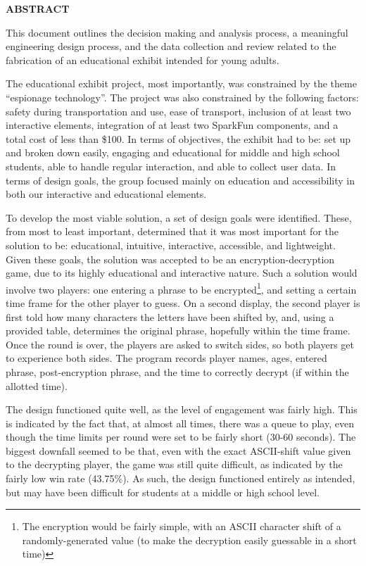 \documentclass[conference]{IEEEtran}
\begin{document}
\begin{center}
\LARGE \textbf{ABSTRACT}
\end{center}
\begin{justify}
\par This document outlines the decision making and analysis process, a meaningful engineering design process, and the data collection and review related to the fabrication of an educational exhibit intended for young adults.
\par The educational exhibit project, most importantly, was constrained by the theme ``espionage technology''. The project was also constrained by the following factors: safety during transportation and use, ease of transport, inclusion of at least two interactive elements, integration of at least two SparkFun components, and a total cost of less than \$100. In terms of objectives, the exhibit had to be: set up and broken down easily, engaging and educational for middle and high school students, able to handle regular interaction, and able to collect user data. In terms of design goals, the group focused mainly on education and accessibility in both our interactive and educational elements. 
\par To develop the most viable solution, a set of design goals were identified. These, from most to least important, determined that it was most important for the solution to be: educational, intuitive, interactive, accessible, and lightweight. Given these goals, the solution was accepted to be an encryption-decryption game, due to its highly educational and interactive nature. Such a solution would involve two players: one entering a phrase to be encrypted\footnote{The encryption would be fairly simple, with an ASCII character shift of a randomly-generated value (to make the decryption easily guessable in a short time)}, and setting a certain time frame for the other player to guess. On a second display, the second player is first told how many characters the letters have been shifted by, and, using a provided table, determines the original phrase, hopefully within the time frame. Once the round is over, the players are asked to switch sides, so both players get to experience both sides. The program records player names, ages, entered phrase, post-encryption phrase, and the time to correctly decrypt (if within the allotted time).
\par The design functioned quite well, as the level of engagement was fairly high. This is indicated by the fact that, at almost all times, there was a queue to play, even though the time limits per round were set to be fairly short (30-60 seconds). The biggest downfall seemed to be that, even with the exact ASCII-shift value given to the decrypting player, the game was still quite difficult, as indicated by the fairly low win rate (43.75\%). As such, the design functioned entirely as intended, but may have been difficult for students at a middle or high school level.
\end{justify}
\end{document}
